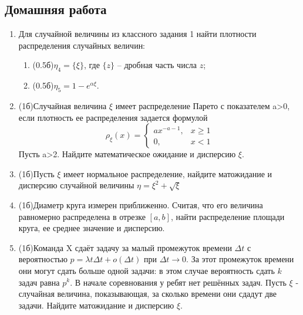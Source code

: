 \documentclass[a4paper, 14pt]{extarticle}
\begin{document}
	\subsection*{Домашняя работа}
	\begin{enumerate}
		\item Для случайной величины из классного задания 1 найти плотности распределения случайных величин:
		\begin{enumerate}
			\item (0.5б)$\eta_4=\{\xi\}$, где $\{z\}$ -- дробная часть числа $z$; 
			\item (0.5б)$\eta_5=1-e^{\alpha\xi}$.
		\end{enumerate}
		\item (1б)Случайная величина $\xi$ имеет распределение Парето с показателем a>0, если плотность ее распределения задается формулой
		$$\rho_\xi(x) =\left\{
		\begin{array}{cc}
		ax^{-a-1}, & x\geq 1 \\
		0, & x<1
		\end{array}\right.$$
		Пусть a>2. Найдите математическое ожидание и дисперсию $\xi$.
		\item (1б)Пусть $\xi$ имеет нормальное распределение, найдите матожидание и дисперсию случайной величины $\eta = \xi^2 + \sqrt{\xi}$
		\item (1б)Диаметр круга измерен приближенно. Считая, что
		его величина равномерно распределена в отрезке $[a,b]$, найти
		распределение площади круга, ее среднее значение и дисперсию.
		\item (1б)Команда X сдаёт задачу за малый промежуток времени $\Delta t$ с вероятностью $p = \lambda t \Delta t + o(\Delta t)$ при $\Delta t \to 0$. За этот промежуток времени они могут сдать больше одной задачи: в этом случае вероятность сдать $k$ задач равна $p^k$. В начале соревнования у ребят нет решённых задач. Пусть $\xi$ - случайная величина, показывающая, за сколько времени они сдадут две задачи. Найдите матожидание и дисперсию $\xi$.
	\end{enumerate}	
\end{document}
